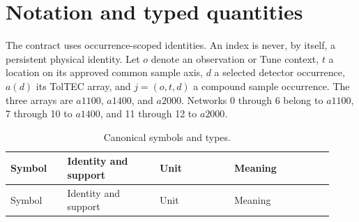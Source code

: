 \section{Notation and typed quantities}
\label{sec:notation}

The contract uses occurrence-scoped identities. An index is never, by itself,
a persistent physical identity. Let $o$ denote an observation or Tune
context, $t$ a location on its approved common sample axis, $d$ a selected
detector occurrence, $a(d)$ its TolTEC array, and $j=(o,t,d)$ a compound
sample occurrence. The three arrays are $a1100$, $a1400$, and $a2000$.
Networks 0 through 6 belong to $a1100$, 7 through 10 to $a1400$, and 11
through 12 to $a2000$.

\begin{longtable}{L{0.16\linewidth}L{0.26\linewidth}L{0.21\linewidth}L{0.29\linewidth}}
\caption{Canonical symbols and types.}\label{tab:notation}\\
\toprule
Symbol & Identity and support & Unit & Meaning \\
\midrule
\endfirsthead
\toprule
Symbol & Identity and support & Unit & Meaning \\
\midrule
\endhead


\end{longtable}
